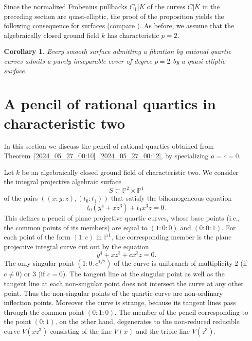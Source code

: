 \documentclass[12pt,reqno]{amsart}
\newtheorem{cor}[thm]{Corollary}
\theoremstyle{definition}
\newcommand{\su}{\subset}
\newcommand{\PP}{\mathbb{P}}
\begin{document}
Since the normalized Frobenius pullbacks $C_1|K$ of the curves $C|K$ in the preceding section are quasi-elliptic, the proof of the proposition yields the following consequence for surfaces (compare \cite[Corollary~4.1.16]{CDL23}).
As before, we assume that the algebraically closed ground field $k$ has characteristic $p=2$.

\begin{cor}\label{2025_10_10_16:30}
Every smooth surface admitting a fibration by rational quartic curves admits a purely inseparable cover of degree $p=2$ by a quasi-elliptic surface.
\end{cor}


\section{A pencil of rational quartics in characteristic two}
\label{2024_06_02_00:30}

In this section we discuss the pencil of rational quartics obtained from Theorem~\ref{2024_05_27_00:10}~\ref{2024_05_27_00:12}, by specializing $a=c=0$.

\medskip

Let $k$ be an algebraically closed ground field of characteristic two.
We consider the integral projective algebraic surface
\[ S\su \PP^2 \times \PP^1 \]
of the pairs $((x:y:z),(t_0:t_1))$ that satisfy the bihomogeneous equation
\[ t_0 (y^4 + x z^3) + t_1 x^3 z = 0. \]
This defines a pencil of plane projective quartic curves, whose base points (i.e., the common points of its members) are equal to $(1:0:0)$ and $(0:0:1)$.
For each point of the form $(1:c)$ in $\PP^1$, the corresponding member is the plane projective integral curve cut out by the equation
\[ y^4 + xz^3+ c x^3 z = 0. \]
The only singular point $(1:0:c^{1/2})$ of the curve is unibranch of multiplicity $2$ (if $c \neq 0$) or $3$ (if $c = 0$).
The tangent line at the singular point as well as the tangent line at each non-singular point does not intersect the curve at any other point.
Thus the non-singular points of the quartic curve are non-ordinary inflection points.
Moreover the curve is strange, because its tangent lines pass through the common point $(0:1:0)$.
The member of the pencil corresponding to the point $(0:1)$, on the other hand, degenerates to the non-reduced reducible curve $V(x z^3)$ consisting of the line $V(x)$ and the triple line $V(z^3)$.
\end{document}
